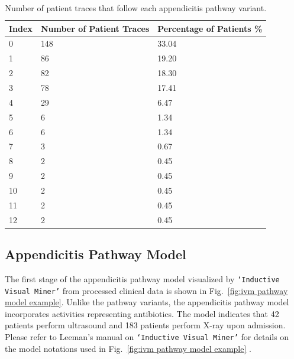 \documentclass{elsarticle}
\begin{document}
\begin{table}[t]
\centering
\caption{Number of patient traces that follow each appendicitis pathway variant.}
\label{table:appendicitis variant table}
\begin{tabular}{ l l l }
 \hline
 Index & Number of Patient Traces & Percentage of Patients \% \\ 
 \hline
 0 & 148 & 33.04\\ 
 \hline
 1 & 86 & 19.20\\ 
 \hline
 2 & 82 & 18.30\\ 
 \hline
 3 & 78 & 17.41\\ 
 \hline
 4 & 29 & 6.47\\ 
 \hline
 5 & 6 & 1.34\\ 
 \hline
 6 & 6 & 1.34\\ 
 \hline
 7 & 3 & 0.67\\ 
 \hline
 8 & 2 & 0.45\\ 
 \hline
 9 & 2 & 0.45\\ 
 \hline
 10 & 2 & 0.45\\ 
 \hline
 11 & 2 & 0.45\\ 
 \hline
 12 & 2 & 0.45\\ 
 \hline
\end{tabular}
\end{table}

\subsection{Appendicitis Pathway Model}
The first stage of the appendicitis pathway model visualized by \texttt{`Inductive Visual Miner'} from processed clinical data is shown in Fig.~\ref{fig:ivm pathway model example}. Unlike the pathway variants, the appendicitis pathway model incorporates activities representing antibiotics. The model indicates that 42 patients perform ultrasound and 183 patients perform X-ray upon admission. Please refer to Leeman's manual on \texttt{`Inductive Visual Miner'} for details on the model notations used in  Fig.~\ref{fig:ivm pathway model example} \cite{leemansinductive}.
\end{document}
